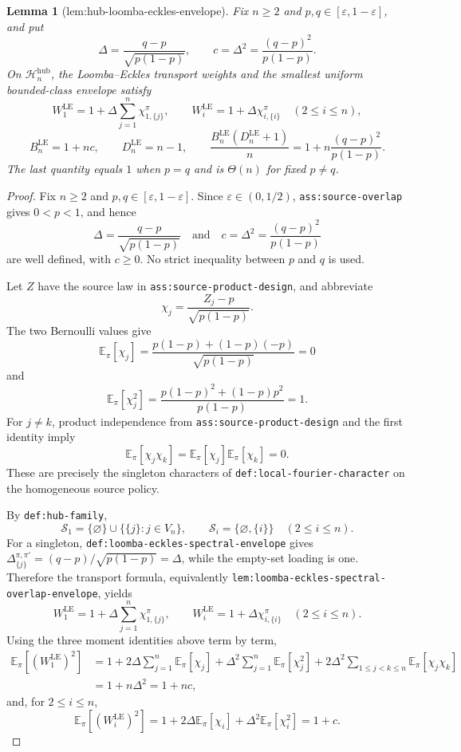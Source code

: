 \documentclass{article}
\newtheorem{lemma}{Lemma}
\begin{document}
\begin{lemma}[lem:hub-loomba-eckles-envelope]\label{lem:hub-loomba-eckles-envelope}
Fix \(n\ge2\) and \(p,q\in[\varepsilon,1-\varepsilon]\), and put
\[
 \Delta=\frac{q-p}{\sqrt{p(1-p)}},
 \qquad c=\Delta^2=\frac{(q-p)^2}{p(1-p)}.
\]
On \(\mathcal H_n^{\mathrm{hub}}\), the Loomba--Eckles transport weights and the smallest uniform bounded-class envelope satisfy
\[
 W_1^{\mathrm{LE}}
 =1+\Delta\sum_{j=1}^n\chi_{1,\{j\}}^{\pi},
 \qquad
 W_i^{\mathrm{LE}}=1+\Delta\chi_{i,\{i\}}^{\pi}\quad(2\le i\le n),
\]
\[
 B_n^{\mathrm{LE}}=1+nc,
 \qquad D_n^{\mathrm{LE}}=n-1,
 \qquad
 \frac{B_n^{\mathrm{LE}}(D_n^{\mathrm{LE}}+1)}{n}=1+n\frac{(q-p)^2}{p(1-p)}.
\]
The last quantity equals \(1\) when \(p=q\) and is \(\Theta(n)\) for fixed \(p\ne q\).
\end{lemma}
\begin{proof}
Fix \(n\ge 2\) and \(p,q\in[\varepsilon,1-\varepsilon]\).  Since \(\varepsilon\in(0,1/2)\), \texttt{ass:source-overlap} gives \(0<p<1\), and hence
\[
 \Delta=\frac{q-p}{\sqrt{p(1-p)}}
 \quad\text{and}\quad
 c=\Delta^2=\frac{(q-p)^2}{p(1-p)}
\]
are well defined, with \(c\ge0\).  No strict inequality between \(p\) and \(q\) is used.

Let \(Z\) have the source law in \texttt{ass:source-product-design}, and abbreviate
\[
 \chi_j=\frac{Z_j-p}{\sqrt{p(1-p)}}.
\]
The two Bernoulli values give
\[
 \mathbb E_{\pi}[\chi_j]
 =\frac{p(1-p)+(1-p)(-p)}{\sqrt{p(1-p)}}=0
\]
and
\[
 \mathbb E_{\pi}[\chi_j^2]
 =\frac{p(1-p)^2+(1-p)p^2}{p(1-p)}=1.
\]
For \(j\ne k\), product independence from \texttt{ass:source-product-design} and the first identity imply
\[
 \mathbb E_{\pi}[\chi_j\chi_k]
 =\mathbb E_{\pi}[\chi_j]\mathbb E_{\pi}[\chi_k]=0.
\]
These are precisely the singleton characters of \texttt{def:local-fourier-character} on the homogeneous source policy.

By \texttt{def:hub-family},
\[
 \mathcal S_1=\{\varnothing\}\cup\{\{j\}:j\in V_n\},
 \qquad
 \mathcal S_i=\{\varnothing,\{i\}\}\quad(2\le i\le n).
\]
For a singleton, \texttt{def:loomba-eckles-spectral-envelope} gives
\(
 \Delta_{\{j\}}^{\pi,\pi'}=(q-p)/\sqrt{p(1-p)}=\Delta
\), while the empty-set loading is one.  Therefore the transport formula, equivalently \texttt{lem:loomba-eckles-spectral-overlap-envelope}, yields
\[
 W_1^{\mathrm{LE}}
 =1+\Delta\sum_{j=1}^n\chi_{1,\{j\}}^{\pi},
 \qquad
 W_i^{\mathrm{LE}}
 =1+\Delta\chi_{i,\{i\}}^{\pi}\quad(2\le i\le n).
\]
Using the three moment identities above term by term,
\[
\begin{aligned}
 \mathbb E_{\pi}\!\left[(W_1^{\mathrm{LE}})^2\right]
 &=1+2\Delta\sum_{j=1}^n\mathbb E_{\pi}[\chi_j]
   +\Delta^2\sum_{j=1}^n\mathbb E_{\pi}[\chi_j^2]
   +2\Delta^2\sum_{1\le j<k\le n}\mathbb E_{\pi}[\chi_j\chi_k]\\
 &=1+n\Delta^2=1+nc,
\end{aligned}
\]
and, for \(2\le i\le n\),
\[
 \mathbb E_{\pi}\!\left[(W_i^{\mathrm{LE}})^2\right]
 =1+2\Delta\mathbb E_{\pi}[\chi_i]
   +\Delta^2\mathbb E_{\pi}[\chi_i^2]
 =1+c.
\]


\end{proof}
\end{document}
